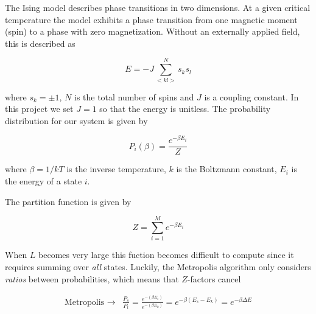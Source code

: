 \documentclass[11pt]{article}
\begin{document}
\begin{flushleft}
The Ising model describes phase transitions in two dimensions. At a given critical temperature the model exhibits a phase transition from one magnetic moment (spin) to a phase with zero magnetization. Without an externally applied field, this is described as

\begin{equation}
E = -J \sum^N_{<kl>} s_k s_l
\end{equation}

where $s_k = \pm 1$, $N$ is the total number of spins and $J$ is a coupling constant. In this project we set $J=1$ so that the energy is unitless. The probability distribution for our system is given by

\begin{equation}
P_i(\beta) = \frac{e^{- \beta E_i}}{Z}
\end{equation}

where $\beta = 1/kT$ is the inverse temperature, $k$ is the Boltzmann constant, $E_i$ is the energy of a state $i$. 


The partition function is given by

\begin{equation}\label{Partition function}
Z = \sum_{i=1}^M e^{- \beta E_i}
\end{equation}


\end{flushleft}

\begin{flushleft}

When $L$ becomes very large this fuction becomes difficult to compute since it requires summing over \textit{all} states. Luckily, the Metropolis algorithm only considers \textit{ratios} between probabilities, which means that $Z$-factors cancel

\begin{align*}
\text{Metropolis } \rightarrow  &\frac{P_s}{P_t} = \frac{e^{-(\beta E_s)}}{e^{-(\beta E_k)}}
= e^{-\beta(E_s - E_k)}
= e^{-\beta \Delta E} 
\end{align*}

\end{flushleft}
\end{document}
